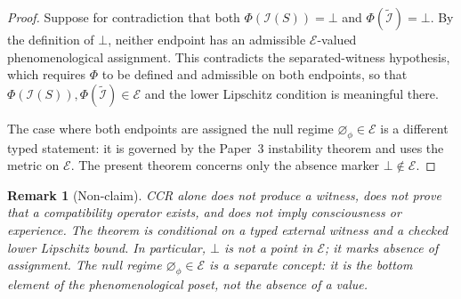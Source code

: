 \documentclass[11pt]{article}
\newtheorem{remark}{Remark}
\newcommand{\I}{\mathcal{I}}
\newcommand{\E}{\mathcal{E}}
\newcommand{\nullphi}{\varnothing_\phi}
\begin{document}
\begin{proof}
Suppose for contradiction that both $\Phi(\I(S))=\bot$ and $\Phi(\tilde{\I})=\bot$.
By the definition of $\bot$, neither endpoint has an admissible $\E$-valued phenomenological assignment. This contradicts the separated-witness hypothesis, which requires $\Phi$ to be defined and admissible on both endpoints, so that $\Phi(\I(S)),\Phi(\tilde{\I})\in\E$ and the lower Lipschitz condition is meaningful there.

The case where both endpoints are assigned the null regime $\nullphi\in\E$ is a different typed statement: it is governed by the Paper~3 instability theorem and uses the metric on $\E$. The present theorem concerns only the absence marker $\bot\notin\E$.
\end{proof}

\begin{remark}[Non-claim]
CCR alone does not produce a witness, does not prove that a compatibility operator exists, and does not imply consciousness or experience. The theorem is conditional on a typed external witness and a checked lower Lipschitz bound. In particular, $\bot$ is not a point in $\E$; it marks absence of assignment. The null regime $\nullphi\in\E$ is a separate concept: it is the bottom element of the phenomenological poset, not the absence of a value.
\end{remark}
\end{document}

